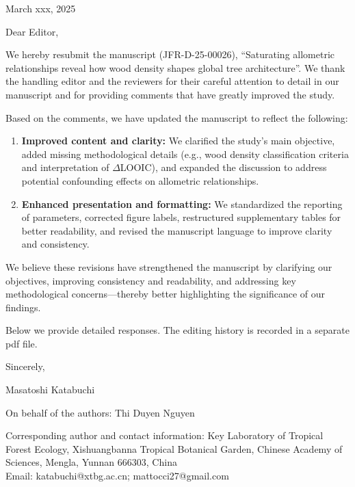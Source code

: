 \documentclass[
  12pt,
  letterpaper,
  DIV=11,
  numbers=noendperiod]{scrartcl}
\author{}
\date{}
\begin{document}
\ifdefined\Shaded\renewenvironment{Shaded}{\begin{tcolorbox}[sharp corners, interior hidden, boxrule=0pt, frame hidden, breakable, borderline west={3pt}{0pt}{shadecolor}, enhanced]}{\end{tcolorbox}}\fi

March xxx, 2025

Dear Editor,

We hereby resubmit the manuscript (JFR-D-25-00026), ``Saturating
allometric relationships reveal how wood density shapes global tree
architecture''. We thank the handling editor and the reviewers for their
careful attention to detail in our manuscript and for providing comments
that have greatly improved the study.

Based on the comments, we have updated the manuscript to reflect the
following:

\begin{enumerate}
\def\labelenumi{\arabic{enumi}.}
\item
  \textbf{Improved content and clarity:} We clarified the study's main
  objective, added missing methodological details (e.g., wood density
  classification criteria and interpretation of \(\Delta\)LOOIC), and
  expanded the discussion to address potential confounding effects on
  allometric relationships.
\item
  \textbf{Enhanced presentation and formatting:} We standardized the
  reporting of parameters, corrected figure labels, restructured
  supplementary tables for better readability, and revised the
  manuscript language to improve clarity and consistency.
\end{enumerate}

We believe these revisions have strengthened the manuscript by
clarifying our objectives, improving consistency and readability, and
addressing key methodological concerns---thereby better highlighting the
significance of our findings.

Below we provide detailed responses. The editing history is recorded in
a separate pdf file.

Sincerely,

Masatoshi Katabuchi

On behalf of the authors: Thi Duyen Nguyen

Corresponding author and contact information: Key Laboratory of Tropical
Forest Ecology, Xishuangbanna Tropical Botanical Garden, Chinese Academy
of Sciences, Mengla, Yunnan 666303, China\\
Email: katabuchi@xtbg.ac.cn; mattocci27@gmail.com
\end{document}
